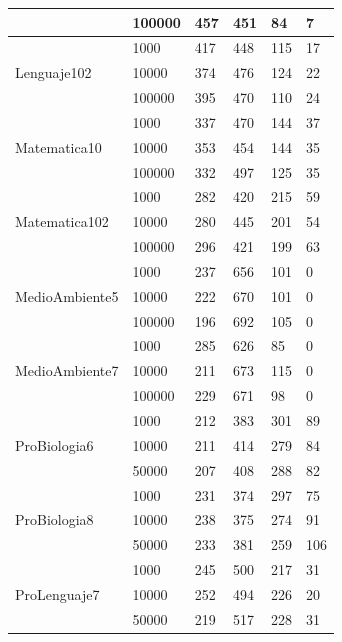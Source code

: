 \begin{longtable}{|p{3cm}|p{3cm}|p{2cm}|p{2cm}|p{2cm}|p{2cm}|}
\cline{2-6}      & 100000 & 457   & 451   & 84    & 7 \\
\hline
\multirow{3}[6]{*}{Lenguaje102} & 1000  & 417   & 448   & 115   & 17 \\
\cline{2-6}      & 10000 & 374   & 476   & 124   & 22 \\
\cline{2-6}      & 100000 & 395   & 470   & 110   & 24 \\
\hline
\multirow{3}[6]{*}{Matematica10} & 1000  & 337   & 470   & 144   & 37 \\
\cline{2-6}      & 10000 & 353   & 454   & 144   & 35 \\
\cline{2-6}      & 100000 & 332   & 497   & 125   & 35 \\
\hline
\multirow{3}[6]{*}{Matematica102} & 1000  & 282   & 420   & 215   & 59 \\
\cline{2-6}      & 10000 & 280   & 445   & 201   & 54 \\
\cline{2-6}      & 100000 & 296   & 421   & 199   & 63 \\
\hline
\multirow{3}[6]{*}{MedioAmbiente5} & 1000  & 237   & 656   & 101   & 0 \\
\cline{2-6}      & 10000 & 222   & 670   & 101   & 0 \\
\cline{2-6}      & 100000 & 196   & 692   & 105   & 0 \\
\hline
\multirow{3}[6]{*}{MedioAmbiente7} & 1000  & 285   & 626   & 85    & 0 \\
\cline{2-6}      & 10000 & 211   & 673   & 115   & 0 \\
\cline{2-6}      & 100000 & 229   & 671   & 98    & 0 \\
\hline
\multirow{3}[6]{*}{ProBiologia6} & 1000  & 212   & 383   & 301   & 89 \\
\cline{2-6}      & 10000 & 211   & 414   & 279   & 84 \\
\cline{2-6}      & 50000 & 207   & 408   & 288   & 82 \\
\hline
\multirow{3}[6]{*}{ProBiologia8} & 1000  & 231   & 374   & 297   & 75 \\
\cline{2-6}      & 10000 & 238   & 375   & 274   & 91 \\
\cline{2-6}      & 50000 & 233   & 381   & 259   & 106 \\
\hline
\multirow{3}[6]{*}{ProLenguaje7} & 1000  & 245   & 500   & 217   & 31 \\
\cline{2-6}      & 10000 & 252   & 494   & 226   & 20 \\
\cline{2-6}      & 50000 & 219   & 517   & 228   & 31 \\

\end{longtable}
